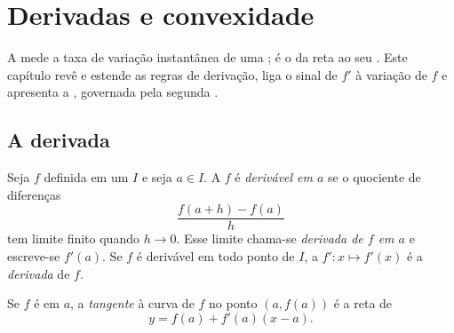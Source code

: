\chapter{Derivadas e convexidade}\label{ch:g12:deriv}

A  mede a taxa de variação instantânea de uma ; é o
 da reta  ao seu . Este capítulo revê e
estende as regras de derivação, liga o sinal de $f'$ à variação de $f$ e
apresenta a , governada pela segunda .

\section{A derivada}

\begin{definition}\label{def:g12:deriv:derivative}
Seja $f$ definida em um  $I$ e seja $a \in I$. A  $f$ é
\emph{derivável em $a$} se o quociente de
diferenças
\[
\frac{f(a+h) - f(a)}{h}
\]
tem limite finito quando $h \to 0$. Esse limite chama-se \emph{derivada de
$f$ em $a$} e escreve-se $f'(a)$. Se $f$ é derivável em todo ponto de
$I$, a  $f' \colon x \mapsto f'(x)$ é a \emph{derivada} de $f$.
\end{definition}

\begin{definition}\label{def:g12:deriv:tangent}
Se $f$ é  em $a$, a \emph{tangente} à curva de
$f$ no ponto $(a, f(a))$ é a reta de 
\[
y = f(a) + f'(a)(x - a).
\]
\end{definition}

